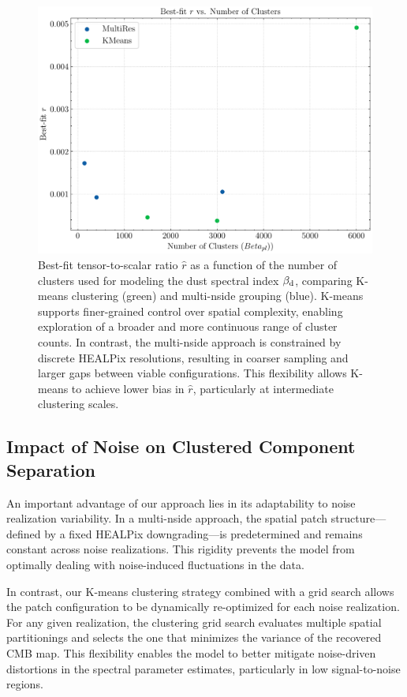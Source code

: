 \documentclass[fleqn,usenatbib]{mnras}
\begin{document}
\begin{figure}
    \centering
    \includegraphics[width=0.9\linewidth]{figures/r_vs_clusters.pdf}
    \caption{
    Best-fit tensor-to-scalar ratio \( \hat{r} \) as a function of the number of clusters used for modeling the dust spectral index \( \beta_{\rm d} \), comparing K-means clustering (green) and multi-nside grouping (blue). 
    K-means supports finer-grained control over spatial complexity, enabling exploration of a broader and more continuous range of cluster counts. 
    In contrast, the multi-nside approach is constrained by discrete HEALPix resolutions, resulting in coarser sampling and larger gaps between viable configurations.
    This flexibility allows K-means to achieve lower bias in \( \hat{r} \), particularly at intermediate clustering scales.
}    
    \label{fig:r_vs_clusters}
\end{figure}


\subsection{Impact of Noise on Clustered Component Separation}
\label{subsec:noise_impact}

An important advantage of our approach lies in its adaptability to noise realization variability. In a multi-nside approach, the spatial patch structure—defined by a fixed HEALPix downgrading—is predetermined and remains constant across noise realizations. This rigidity prevents the model from optimally dealing with noise-induced fluctuations in the data.

In contrast, our K-means clustering strategy combined with a grid search allows the patch configuration to be dynamically re-optimized for each noise realization. For any given realization, the clustering grid search evaluates multiple spatial partitionings and selects the one that minimizes the variance of the recovered CMB map. This flexibility enables the model to better mitigate noise-driven distortions in the spectral parameter estimates, particularly in low signal-to-noise regions.
\end{document}
